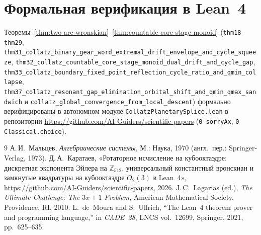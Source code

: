 \documentclass[11pt,a4paper]{article}
\theoremstyle{definition}
\theoremstyle{remark}
\begin{document}
\section{Формальная верификация в Lean~4}
Теоремы~\ref{thm:two-arc-wronskian}--\ref{thm:countable-core-stage-monoid} (\texttt{thm18}--\texttt{thm29}, \texttt{thm31\_collatz\_binary\_gear\_word\_extremal\_drift\_envelope\_and\_cycle\_squeeze}, \texttt{thm32\_collatz\_countable\_core\_stage\_monoid\_dual\_drift\_and\_cycle\_gap}, \texttt{thm33\_collatz\_boundary\_fixed\_point\_reflection\_cycle\_ratio\_and\_qmin\_collapse}, \texttt{thm37\_collatz\_resonant\_gap\_elimination\_orbital\_shift\_and\_qmin\_qmax\_sandwich} и \texttt{collatz\_global\_convergence\_from\_local\_descent}) формально верифицированы в автономном модуле \texttt{CollatzPlanetarySplice.lean} в репозитории \url{https://github.com/AI-Guiders/scientific-papers} (\texttt{0 sorryAx}, \texttt{0 Classical.choice}).

\begin{thebibliography}{9}
А.\,И.~Мальцев, \emph{Алгебраические системы}, М.: Наука, 1970 (англ.\ пер.: Springer-Verlag, 1973).
Д.\,А.~Каратаев, «Ротаторное исчисление на кубооктаэдре: дискретная экспонента Эйлера на $\mathbb{Z}_{512}$, универсальный константный вронскиан и замкнутые квадратуры на кубооктаэдре $O_2(3)$ в Lean~4», \url{https://github.com/AI-Guiders/scientific-papers}, 2026.
J.\,C.~Lagarias (ed.), \emph{The Ultimate Challenge: The $3x+1$ Problem}, American Mathematical Society, Providence, RI, 2010.
L.~de~Moura and S.~Ullrich, ``The Lean~4 theorem prover and programming language,'' in \emph{CADE~28}, LNCS vol.~12699, Springer, 2021, pp.~625--635.
\end{thebibliography}
\end{document}
